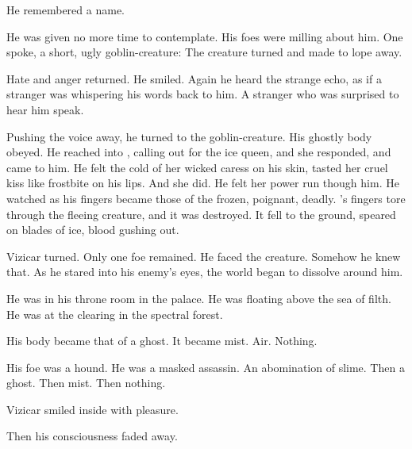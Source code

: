 He remembered a name.  


He was given no more time to contemplate. His foes were milling about him. One spoke, a short, ugly goblin-creature:  The creature turned and made to lope away. 

Hate and anger returned. He smiled.  Again he heard the strange echo, as if a stranger was whispering his words back to him. A stranger who was surprised to hear him speak. 

Pushing the voice away, he turned to the goblin-creature. His ghostly body obeyed. %
 \ta{\Horvaleth!} He reached into \nieur{}, calling out for the ice queen, and she responded, and came to him. He felt the cold of her wicked caress on his skin, tasted her cruel kiss like frostbite on his lips.  And she did. He felt her power run though him. He watched as his fingers became those of the \Qliphah\dash frozen, poignant, deadly. \Horvaleth's fingers tore through the fleeing creature, and it was destroyed. It fell to the ground, speared on blades of ice, blood gushing out. 

Vizicar turned. Only one foe remained. He faced the creature.  Somehow he knew that.  As he stared into his enemy's eyes, the world began to dissolve around him. 


He was in his throne room in the palace. He was floating above the sea of filth. He was at the clearing in the spectral forest. 


His body became that of a ghost. It became mist. Air. Nothing. 


His foe was a hound. He was a masked assassin. An abomination of slime. Then a ghost. Then mist. Then nothing. 


Vizicar smiled inside with pleasure. 

Then his consciousness faded away. 









